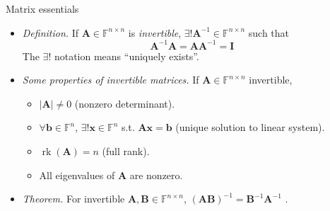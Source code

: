 \documentclass{beamer}
\numberwithin{equation}{section}
\begin{document}
\begin{frame}{Matrix essentials}
    \begin{itemize}
        \item
        \textit{Definition.} If $ \mathbf{A} \in \mathbb{F}^{n \times n} $ is
        \textit{invertible}, $ \exists! \mathbf{A}^{-1} \in
        \mathbb{F}^{n \times n} $ such that
        \begin{equation*}
            \mathbf{A}^{-1}\mathbf{A} = \mathbf{AA}^{-1} = \mathbf{I}
        \end{equation*}
        The $ \exists! $ notation means ``uniquely exists''.

        \item
        \textit{
            Some properties of invertible matrices\footnotemark{}.
        } If $ \mathbf{A} \in
        \mathbb{F}^{n \times n} $ invertible,
        \begin{itemize}
            \item
            $ |\mathbf{A}| \ne 0 $ (nonzero determinant).

            \item
            $ \forall \mathbf{b} \in \mathbb{F}^n $, $ \exists! \mathbf{x} \in
            \mathbb{F}^n $ s.t. $ \mathbf{Ax} = \mathbf{b} $ (unique solution
            to linear system).

            \item
            $ \operatorname{rk}(\mathbf{A}) = n $ (full rank).

            \item
            All eigenvalues of $ \mathbf{A} $ are nonzero.
        \end{itemize}

        \item
        \textit{Theorem.} For invertible $ \mathbf{A}, \mathbf{B} \in
        \mathbb{F}^{n \times n} $, $ (\mathbf{AB})^{-1} =
        \mathbf{B}^{-1}\mathbf{A}^{-1} $ \cite{jacob_linalg}.
    \end{itemize}
\end{frame}
\end{document}
